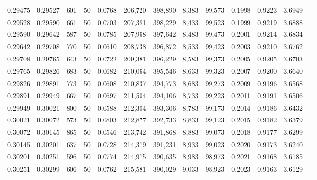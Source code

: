 \begin{tabular}{rrrrrrrrrrrrr}
0.29475 & 0.29527 &   601 &  50 &                                     0.0768 & 206,720 & 398,890 &   8,383 &  99,573 & 0.1998 & 0.9223 & 3.6949 \\
0.29528 & 0.29590 &   661 &  50 &                                     0.0703 & 207,381 & 398,229 &   8,433 &  99,523 & 0.1999 & 0.9219 & 3.6888 \\
0.29590 & 0.29642 &   587 &  50 &                                     0.0785 & 207,968 & 397,642 &   8,483 &  99,473 & 0.2001 & 0.9214 & 3.6834 \\
0.29642 & 0.29708 &   770 &  50 &                                     0.0610 & 208,738 & 396,872 &   8,533 &  99,423 & 0.2003 & 0.9210 & 3.6762 \\
0.29708 & 0.29765 &   643 &  50 &                                     0.0722 & 209,381 & 396,229 &   8,583 &  99,373 & 0.2005 & 0.9205 & 3.6703 \\
0.29765 & 0.29826 &   683 &  50 &                                     0.0682 & 210,064 & 395,546 &   8,633 &  99,323 & 0.2007 & 0.9200 & 3.6640 \\
0.29826 & 0.29891 &   773 &  50 &                                     0.0608 & 210,837 & 394,773 &   8,683 &  99,273 & 0.2009 & 0.9196 & 3.6568 \\
0.29891 & 0.29949 &   667 &  50 &                                     0.0697 & 211,504 & 394,106 &   8,733 &  99,223 & 0.2011 & 0.9191 & 3.6506 \\
0.29949 & 0.30021 &   800 &  50 &                                     0.0588 & 212,304 & 393,306 &   8,783 &  99,173 & 0.2014 & 0.9186 & 3.6432 \\
0.30021 & 0.30072 &   573 &  50 &                                     0.0803 & 212,877 & 392,733 &   8,833 &  99,123 & 0.2015 & 0.9182 & 3.6379 \\
0.30072 & 0.30145 &   865 &  50 &                                     0.0546 & 213,742 & 391,868 &   8,883 &  99,073 & 0.2018 & 0.9177 & 3.6299 \\
0.30145 & 0.30201 &   637 &  50 &                                     0.0728 & 214,379 & 391,231 &   8,933 &  99,023 & 0.2020 & 0.9173 & 3.6240 \\
0.30201 & 0.30251 &   596 &  50 &                                     0.0774 & 214,975 & 390,635 &   8,983 &  98,973 & 0.2021 & 0.9168 & 3.6185 \\
0.30251 & 0.30299 &   606 &  50 &                                     0.0762 & 215,581 & 390,029 &   9,033 &  98,923 & 0.2023 & 0.9163 & 3.6129 \\

\end{tabular}

